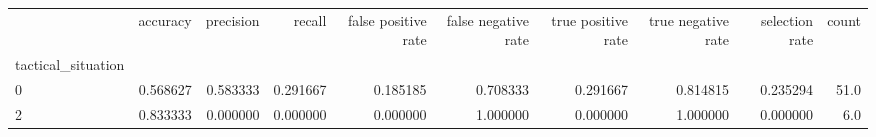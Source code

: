 \begin{tabular}{lrrrrrrrrr}
\toprule
{} &  accuracy &  precision &    recall &  false positive rate &  false negative rate &  true positive rate &  true negative rate &  selection rate &  count \\
tactical\_situation &           &            &           &                      &                      &                     &                     &                 &        \\
\midrule
0                  &  0.568627 &   0.583333 &  0.291667 &             0.185185 &             0.708333 &            0.291667 &            0.814815 &        0.235294 &   51.0 \\
2                  &  0.833333 &   0.000000 &  0.000000 &             0.000000 &             1.000000 &            0.000000 &            1.000000 &        0.000000 &    6.0 \\
\bottomrule
\end{tabular}

